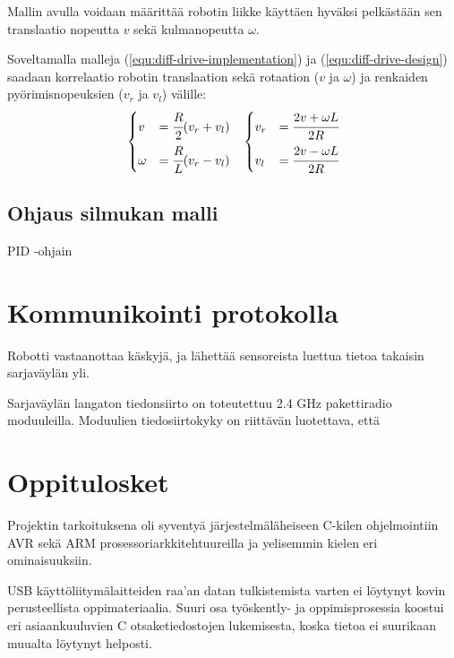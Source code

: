 \documentclass[]{article} %
\numberwithin{equation}{section}
\numberwithin{figure}{section}
\numberwithin{table}{section}
\begin{document}
Mallin avulla voidaan määrittää robotin liikke käyttäen hyväksi pelkästään sen translaatio nopeutta $v$ sekä kulmanopeutta $\omega$.

Soveltamalla malleja (\ref{equ:diff-drive-implementation}) ja (\ref{equ:diff-drive-design}) saadaan korrelaatio robotin translaation sekä rotaation ($v$ ja $\omega$) ja renkaiden pyörimisnopeuksien ($v_r$ ja $v_l$) välille:
\begin{align}
    \label{equ:diff-drive-correlation}
    &
    \begin{dcases}
        v &= \cfrac{R}{2} (v_r + v_l)\\
        \omega &= \cfrac{R}{L} (v_r - v_l)\\
    \end{dcases}
    &
    \begin{dcases}
        v_r &= \cfrac{2v + \omega L}{2R}\\
        v_l &= \cfrac{2v - \omega L}{2R}\\
    \end{dcases}
\end{align}



\subsection{Ohjaus silmukan malli}
\label{sub:Ohjaus silmukan malli}

PID -ohjain


\section{Kommunikointi protokolla}
\label{sec:Kommunikointi protokilla}

Robotti vastaanottaa käskyjä, ja lähettää sensoreista luettua tietoa takaisin sarjaväylän yli.

Sarjaväylän langaton tiedonsiirto on toteutettuu 2.4 GHz pakettiradio moduuleilla.
Moduulien tiedosiirtokyky on riittävän luotettava, että 


\section{Oppitulosket}
\label{sec:Oppitulosket}

Projektin tarkoituksena oli syventyä järjestelmäläheiseen C-kilen ohjelmointiin AVR sekä ARM prosessoriarkkitehtuureilla ja yelisemmin kielen eri ominaisuuksiin.

USB käyttöliitymälaitteiden raa'an datan tulkistemista varten ei löytynyt kovin perusteellista oppimateriaalia.
Suuri osa työskently- ja oppimisprosessia koostui eri asiaankuuluvien C otsaketiedostojen lukemisesta, koska tietoa ei suurikaan muualta löytynyt helposti. 
\end{document}
